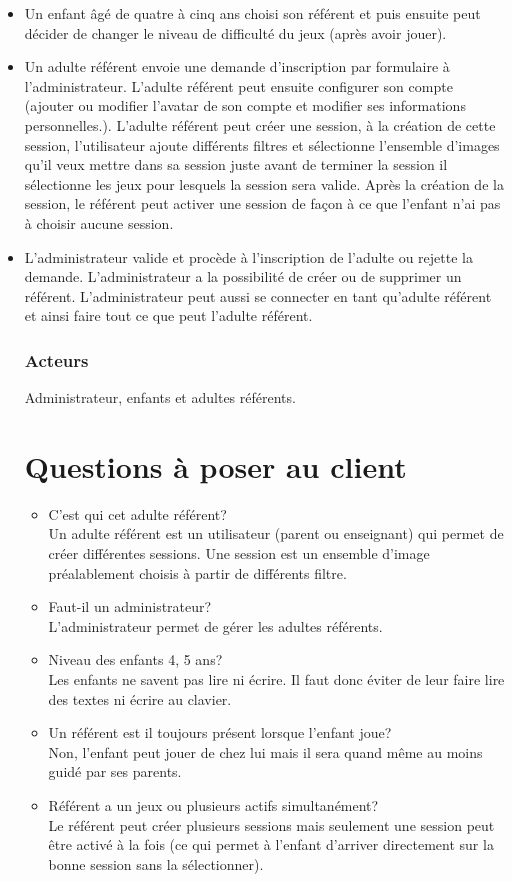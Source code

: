 \documentclass[12pt,a4paper]{report}
\begin{document}
\begin{itemize}
\item Un enfant âgé de quatre à cinq ans choisi son référent et puis ensuite peut décider de changer le niveau de difficulté du jeux (après avoir jouer).
\item Un adulte référent envoie une demande d'inscription par formulaire à l'administrateur. L'adulte référent peut ensuite configurer son compte (ajouter ou modifier l'avatar de son compte et modifier ses informations personnelles.). L'adulte référent peut créer une session, à la création de cette session, l'utilisateur ajoute différents filtres et sélectionne l'ensemble d'images qu'il veux mettre dans sa session juste avant de terminer la session il sélectionne les jeux pour lesquels la session sera valide. Après la création de la session, le référent peut activer une session de façon à ce que l'enfant n'ai pas à choisir aucune session.
\item L'administrateur valide et procède à l'inscription de l'adulte ou rejette la demande. L'administrateur a la possibilité de créer ou de supprimer un référent. L'administrateur peut aussi se connecter en tant qu'adulte référent et ainsi faire tout ce que peut l'adulte référent.
\begin{itemize}

\subsection{Acteurs}
Administrateur, enfants et adultes référents.

\chapter{Questions à poser au client}

\begin{itemize}
\item C'est qui cet adulte référent?\\
Un adulte référent est un utilisateur (parent ou enseignant) qui permet de créer différentes sessions. Une session est un ensemble d'image préalablement choisis à partir de différents filtre.
\item Faut-il un administrateur?\\
L'administrateur permet de gérer les adultes référents.
\item Niveau des enfants 4, 5 ans?\\
Les enfants ne savent pas lire ni écrire. Il faut donc éviter de leur faire lire des textes ni écrire au clavier.
\item Un référent est il toujours présent lorsque l'enfant joue?\\
Non, l'enfant peut jouer de chez lui mais il sera quand même au moins guidé par ses parents.
\item Référent a un jeux ou plusieurs actifs simultanément?\\
Le référent peut créer plusieurs sessions mais seulement une session peut être activé à la fois (ce qui permet à l'enfant d'arriver directement sur la bonne session sans la sélectionner).
\end{itemize}


\end{itemize}
\end{itemize}
\end{document}
